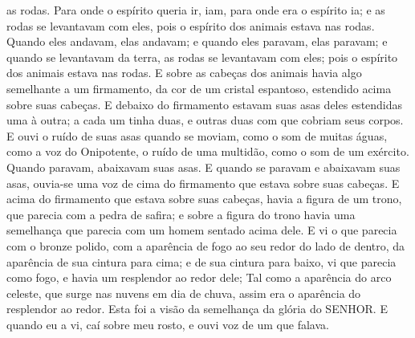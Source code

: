 {{} as rodas.
Para onde o espírito queria ir, iam, para onde era o espírito ia; e as rodas
{} se levantavam com eles, pois o espírito dos animais estava nas rodas.
Quando eles andavam, elas andavam; e quando eles paravam, elas paravam; e quando se levantavam da terra, as rodas se levantavam com eles; pois o espírito dos animais estava nas rodas.
E sobre as cabeças dos animais havia algo semelhante a um firmamento,
 da cor de um cristal espantoso, estendido acima sobre suas cabeças.
E debaixo do firmamento estavam suas asas deles estendidas uma à outra; a cada um tinha duas, e outras duas com que cobriam seus corpos.
E ouvi o ruído de suas asas quando se moviam, como o som de muitas águas, como a voz do Onipotente, o ruído de uma multidão, como o som de um exército. Quando paravam, abaixavam suas asas.
E quando se paravam e abaixavam suas asas, ouvia-se uma voz de cima do firmamento que estava sobre suas cabeças.
E acima do firmamento que estava sobre suas cabeças, havia a figura de um trono, que parecia com a pedra de safira; e sobre a figura do trono havia uma semelhança que parecia com um homem sentado acima dele.
E vi o que parecia com o bronze polido, com a aparência de fogo ao seu redor do lado de dentro, da aparência de sua cintura
 para cima; e de sua cintura para baixo, vi que parecia como fogo, e havia um resplendor ao redor dele;
Tal como a aparência do arco celeste, que surge nas nuvens em dia de chuva, assim era o aparência do resplendor ao redor. Esta foi a visão da semelhança da glória do SENHOR. E quando eu a vi, caí sobre meu rosto, e ouvi voz de um que falava.

\par }
